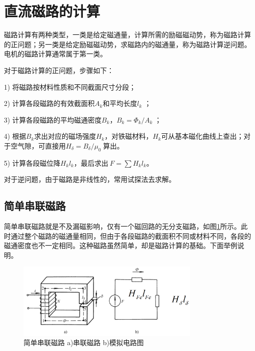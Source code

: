 \documentclass{book}
\begin{document}
\section{直流磁路的计算}
磁路计算有两种类型，一类是给定磁通量，计算所需的励磁磁动势，称为磁路计算的正问题；另一类是给定励磁磁动势，求磁路内的磁通量，称为磁路计算逆问题。电机的磁路计算通常属于第一类。

对于磁路计算的正问题，步骤如下：

1)	将磁路按材料性质和不同截面尺寸分段；

2)	计算各段磁路的有效截面积${{A}_{k}}$和平均长度${{l}_{k}}$ ；

3)	计算各段磁路的平均磁通密度${{B}_{k}}$，${{B}_{k}}={{{\Phi }_{k}}}/{{{A}_{k}}}\;$；

4)	根据${{B}_{k}}$求出对应的磁场强度${{H}_{k}}$，对铁磁材料，${{H}_{k}}$可从基本磁化曲线上查出；对于空气隙，可直接用${{H}_{\delta }}={{{B}_{\delta }}}/{{{\mu }_{0}}}\;$算出。

5)	计算各段磁位降${{H}_{k}}{{l}_{k}}$，最后求出$~F=\sum{{{H}_{k}}{{l}_{k}}}$。

对于逆问题，由于磁路是非线性的，常用试探法去求解。

\subsection{简单串联磁路}
简单串联磁路就是不及漏磁影响，仅有一个磁回路的无分支磁路，如图\ref{fig_chuanliancilu}所示。此时通过整个磁路的磁通量相同，但由于各段磁路的截面积不同或材料不同，各段的磁通密度也不一定相同。这种磁路虽然简单，却是磁路计算的基础。下面举例说明。
\begin{figure}[H]
	\centering
	\includegraphics[width=0.80\textwidth]{chuanliancilu.png}
	\caption{简单串联磁路 a)串联磁路 b)模拟电路图}
	\label{fig_chuanliancilu}
\end{figure}
\end{document}
